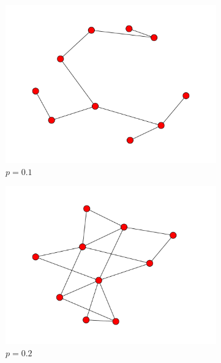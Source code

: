 \documentclass[10pt,a4paper]{scrartcl}
\begin{document}
\begin{figure}[H]
\begin{center}
        \begin{subfigure}[b]{0.3\textwidth}
                \includegraphics[width=\textwidth]{figures/BA_graph_1.pdf}
                \caption{$p=0.1$}
        \end{subfigure}
	 \begin{subfigure}[b]{0.3\textwidth}
                \includegraphics[width=\textwidth]{figures/BA_graph_2.pdf}
                \caption{$p=0.2$}
        \end{subfigure}
	 \begin{subfigure}[b]{0.3\textwidth}

\end{subfigure}
\end{center}
\end{figure}
\end{document}
